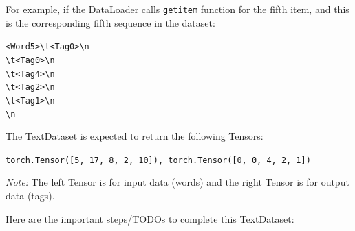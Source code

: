\documentclass[11pt,addpoints,answers]{exam}
\begin{document}
For example, if the DataLoader calls \texttt{getitem} function for the fifth item, and this is the corresponding fifth sequence in the dataset:

    \texttt{<Word5>\textbackslash t<Tag0>\textbackslash n\\<Word17>\textbackslash t<Tag0>\textbackslash n\\<Word8>\textbackslash t<Tag4>\textbackslash n\\<Word2>\textbackslash t<Tag2>\textbackslash n\\<Word10>\textbackslash t<Tag1>\textbackslash n\\\textbackslash n\\}

The TextDataset is expected to return the following Tensors:

    \texttt{torch.Tensor([5, 17, 8, 2, 10]), torch.Tensor([0, 0, 4, 2, 1])}

\textit{Note:} The left Tensor is for input data (words) and the right Tensor is for output data (tags).

Here are the important steps/TODOs to complete this TextDataset:
\end{document}
